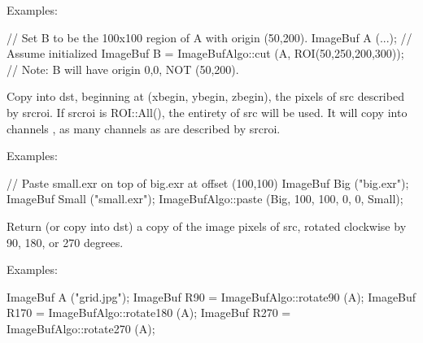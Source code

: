 \smallskip
\noindent Examples:
\begin{code}
    // Set B to be the 100x100 region of A with origin (50,200).
    ImageBuf A (...);  // Assume initialized
    ImageBuf B = ImageBufAlgo::cut (A, ROI(50,250,200,300));
    // Note: B will have origin 0,0, NOT (50,200).
\end{code}
\apiend


 
Copy into {\cf dst}, beginning at {\cf (xbegin, ybegin, zbegin)}, the pixels of
{\cf src} described by {\cf srcroi}.  If {\cf srcroi} is {\cf ROI::All()},
the entirety of src will be used.  It will copy into channels
{\cf [chbegin...]}, as many channels as are described by {\cf srcroi}.

\smallskip
\noindent Examples:
\begin{code}
    // Paste small.exr on top of big.exr at offset (100,100)
    ImageBuf Big ("big.exr");
    ImageBuf Small ("small.exr");
    ImageBufAlgo::paste (Big, 100, 100, 0, 0, Small);
\end{code}
\apiend


 
 
 
Return (or copy into {\cf dst}) a copy of the image pixels of {\cf src},
rotated clockwise by 90, 180, or 270 degrees.

\smallskip
\noindent Examples:
\begin{code}
    ImageBuf A ("grid.jpg");
    ImageBuf R90 = ImageBufAlgo::rotate90 (A);
    ImageBuf R170 = ImageBufAlgo::rotate180 (A);
    ImageBuf R270 = ImageBufAlgo::rotate270 (A);
\end{code}

